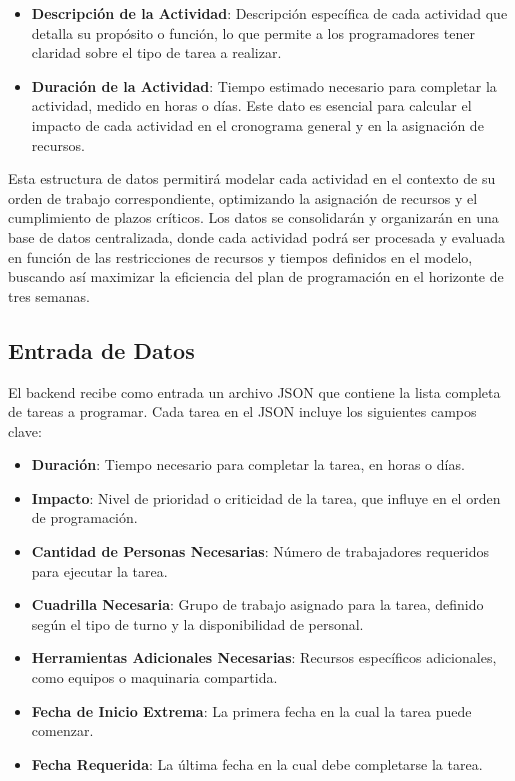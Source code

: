 \documentclass{article}
\begin{document}
\begin{itemize}
    \item \textbf{Descripción de la Actividad}: Descripción específica de cada actividad que detalla su propósito o función, lo que permite a los programadores tener claridad sobre el tipo de tarea a realizar.

    \item \textbf{Duración de la Actividad}: Tiempo estimado necesario para completar la actividad, medido en horas o días. Este dato es esencial para calcular el impacto de cada actividad en el cronograma general y en la asignación de recursos.

\end{itemize}

Esta estructura de datos permitirá modelar cada actividad en el contexto de su orden de trabajo correspondiente, optimizando la asignación de recursos y el cumplimiento de plazos críticos. Los datos se consolidarán y organizarán en una base de datos centralizada, donde cada actividad podrá ser procesada y evaluada en función de las restricciones de recursos y tiempos definidos en el modelo, buscando así maximizar la eficiencia del plan de programación en el horizonte de tres semanas.

\subsection{Entrada de Datos}

El backend recibe como entrada un archivo JSON que contiene la lista completa de tareas a programar. Cada tarea en el JSON incluye los siguientes campos clave:

\begin{itemize}
    \item \textbf{Duración}: Tiempo necesario para completar la tarea, en horas o días.
    \item \textbf{Impacto}: Nivel de prioridad o criticidad de la tarea, que influye en el orden de programación.
    \item \textbf{Cantidad de Personas Necesarias}: Número de trabajadores requeridos para ejecutar la tarea.
    \item \textbf{Cuadrilla Necesaria}: Grupo de trabajo asignado para la tarea, definido según el tipo de turno y la disponibilidad de personal.
    \item \textbf{Herramientas Adicionales Necesarias}: Recursos específicos adicionales, como equipos o maquinaria compartida.
    \item \textbf{Fecha de Inicio Extrema}: La primera fecha en la cual la tarea puede comenzar.
    \item \textbf{Fecha Requerida}: La última fecha en la cual debe completarse la tarea.
\end{itemize}
\end{document}

